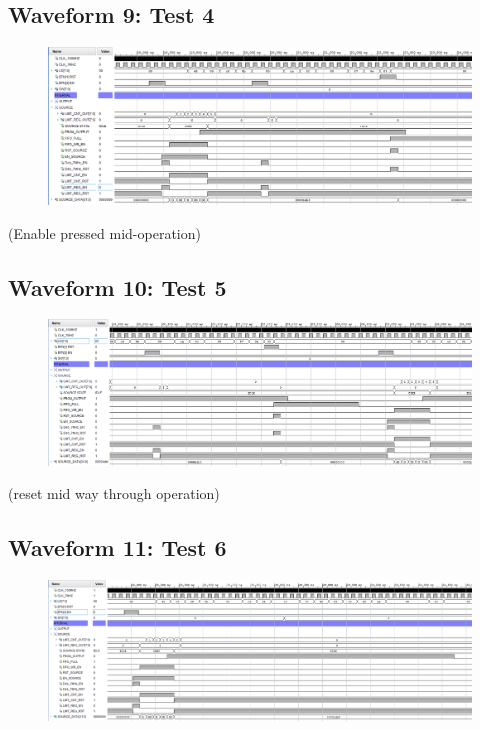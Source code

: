 \documentclass[11pt]{report}
\begin{document}
\subsection*{Waveform 9: Test 4 }
\begin{figure}[H]
       \includegraphics[width=\columnwidth]{Assets/Test4.png}
\end{figure}

(Enable pressed mid-operation)

\subsection*{Waveform 10: Test 5 }
\begin{figure}[H]
       \includegraphics[width=\columnwidth]{Assets/Test5.png}
\end{figure}

(reset mid way through operation)

\subsection*{Waveform 11: Test 6 }
\begin{figure}[H]
       \includegraphics[width=\columnwidth]{Assets/Test6.png}
\end{figure}
\end{document}
